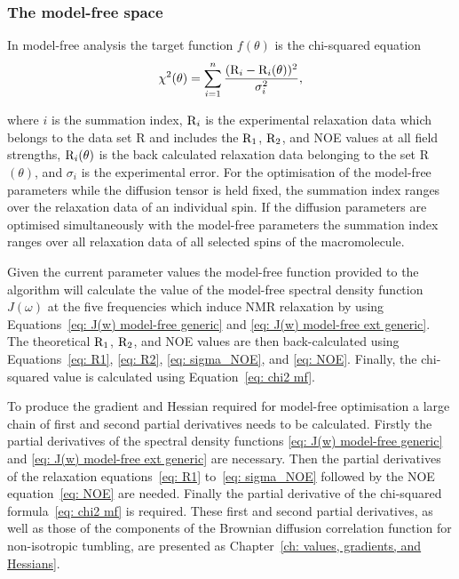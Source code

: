 \begin{htmlonly}
\begin{htmlonly}
\subsubsection{The model-free space}

In model-free analysis the target function $f(\theta)$ is the chi-squared equation
\begin{equation} \label{eq: chi2 mf}
 \chi^2(\theta) = \sum_{i=1}^n \frac{(\mathrm{R}_i - \mathrm{R}_i(\theta))^2}{\sigma_i^2},
\end{equation}

\noindent where $i$ is the summation index, $\mathrm{R}_i$ is the experimental relaxation data which belongs to the data set R and includes the $\mathrm{R}_1$, $\mathrm{R}_2$, and NOE values at all field strengths, $\mathrm{R}_i(\theta)$ is the back calculated relaxation data belonging to the set R$(\theta)$, and $\sigma_i$ is the experimental error.  For the optimisation of the model-free parameters while the diffusion tensor is held fixed, the summation index ranges over the relaxation data of an individual spin.  If the diffusion parameters are optimised simultaneously with the model-free parameters the summation index ranges over all relaxation data of all selected spins of the macromolecule.

Given the current parameter values the model-free function provided to the algorithm will calculate the value of the model-free spectral density function $J(\omega)$ at the five frequencies which induce NMR relaxation by using Equations~\eqref{eq: J(w) model-free generic} and \eqref{eq: J(w) model-free ext generic}.  The theoretical $\mathrm{R}_1$, $\mathrm{R}_2$, and NOE values are then back-calculated using Equations~\eqref{eq: R1}, \eqref{eq: R2}, \eqref{eq: sigma_NOE}, and \eqref{eq: NOE}.  Finally, the chi-squared value is calculated using Equation~\eqref{eq: chi2 mf}.

To produce the gradient and Hessian required for model-free optimisation a large chain of first and second partial derivatives needs to be calculated.  Firstly the partial derivatives of the spectral density functions \eqref{eq: J(w) model-free generic} and \eqref{eq: J(w) model-free ext generic} are necessary.  Then the partial derivatives of the relaxation equations~\eqref{eq: R1} to~\eqref{eq: sigma_NOE} followed by the NOE equation~\eqref{eq: NOE} are needed.  Finally the partial derivative of the chi-squared formula~\eqref{eq: chi2 mf} is required.  These first and second partial derivatives, as well as those of the components of the Brownian diffusion correlation function for non-isotropic tumbling, are presented as Chapter~\ref{ch: values, gradients, and Hessians}.



\end{htmlonly}
\end{htmlonly}
